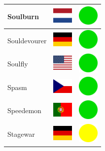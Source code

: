 \documentclass[12pt, a4paper, twoside]{report}
\begin{document}
\begin{center}
\begin{longtable}{|p{5cm}|p{2cm}|p{2cm}|}
Soulburn & \includegraphics[width=1cm]{4x3/nl} & \includegraphics[width=1cm]{likes/y} \\ \hline
Souldevourer & \includegraphics[width=1cm]{4x3/de} & \includegraphics[width=1cm]{likes/y} \\ \hline
Soulfly & \includegraphics[width=1cm]{4x3/us} & \includegraphics[width=1cm]{likes/y} \\ \hline
Spasm & \includegraphics[width=1cm]{4x3/cz} & \includegraphics[width=1cm]{likes/y} \\ \hline
Speedemon & \includegraphics[width=1cm]{4x3/pt} & \includegraphics[width=1cm]{likes/y} \\ \hline
Stagewar & \includegraphics[width=1cm]{4x3/de} & \includegraphics[width=1cm]{likes/m} \\ \hline

\end{longtable}
\end{center}
\end{document}
